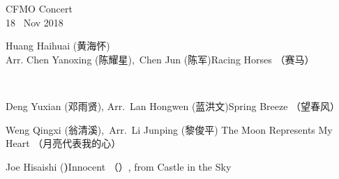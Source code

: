 \documentclass[letter,6pt,poets]{ConcProg}
\begin{document}
\begin{programme}{
    CFMO Concert
\\  {\normalsize 18 ~Nov 2018}
}
\begin{part}[]
\begin{composition}{Huang Haihuai (黄海怀)\\ Arr. Chen Yanoxing (陈耀星),\  Chen Jun (陈军)}{}{Racing Horses  （赛马）}{}
    \end{composition}\\
    \begin{composition}{Deng Yuxian (邓雨贤), Arr.\ Lan Hongwen (蓝洪文)}{}{Spring Breeze  （望春风）}{}
    \end{composition}
    \begin{composition}{Weng Qingxi (翁清溪),\ Arr.\ Li Junping (黎俊平) }{}{The Moon Represents My Heart  （月亮代表我的心）}{}
    \end{composition}
    \begin{composition}{Joe Hisaishi (\textbf{)}}{}{Innocent （）, from Castle in the Sky }{}
                   {}{}
    \end{composition}
    
    


%


\end{part}
\end{programme}
\end{document}
